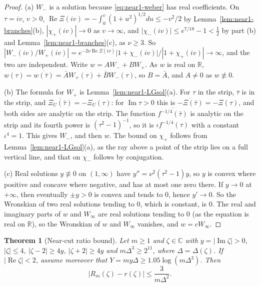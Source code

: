 \documentclass[11pt]{amsart}
\newtheorem{theorem}{Theorem}[section]
\theoremstyle{definition}
\theoremstyle{remark}
\numberwithin{equation}{section}
\newcommand{\C}{\mathbb{C}}
\newcommand{\R}{\mathbb{R}}
\DeclareMathOperator{\re}{Re}
\DeclareMathOperator{\im}{Im}
\begin{document}
\begin{proof}
(a) $W_-$ is a solution because \eqref{eq:near1-weber} has real coefficients. On $\tau=iv$, $v>0$, $\re\Xi(iv)=-\int_0^v(1+u^2)^{1/2}du\le-v^2/2$ by Lemma~\ref{lem:near1-branches}(b), $|\chi_+(iv)|\to0$ as $v\to\infty$, and $|\chi_-(iv)|\le e^{7/18}-1<\frac12$ by part (b) and Lemma~\ref{lem:near1-branches}(c), as $\nu\ge3$. So $|W_-(iv)/W_+(iv)|=e^{-2\nu\re\Xi(iv)}|1+\chi_-(iv)|/|1+\chi_+(iv)|\to\infty$, and the two are independent. Write $w=AW_-+BW_+$. As $w$ is real on $\R$, $w(\tau)=\overline{w(\bar\tau)}=\bar AW_+(\tau)+\bar BW_-(\tau)$, so $B=\bar A$, and $A\ne0$ as $w\not\equiv0$.

(b) The formula for $W_+$ is Lemma~\ref{lem:near1-LGsol}(a). For $\tau$ in the strip, $\bar\tau$ is in the strip, and $\overline{\Xi_U(\bar\tau)}=-\Xi_U(\tau)$: for $\im\tau>0$ this is $\overline{-\Xi(\bar\tau)}=-\Xi(\tau)$, and both sides are analytic on the strip. The function $\overline{f^{-1/4}(\bar\tau)}$ is analytic on the strip and its fourth power is $(\tau^2-1)^{-1}$, so it is $\iota f^{-1/4}(\tau)$ with a constant $\iota^4=1$. This gives $W_-$, and then $w$. The bound on $\chi_+$ follows from Lemma~\ref{lem:near1-LGsol}(a), as the ray above a point of the strip lies on a full vertical line, and that on $\chi_-$ follows by conjugation.

(c) Real solutions $y\not\equiv0$ on $(1,\infty)$ have $y''=\nu^2(\tau^2-1)y$, so $y$ is convex where positive and concave where negative, and has at most one zero there. If $y\to0$ at $+\infty$, then eventually $\pm y>0$ is convex and tends to $0$, hence $y'\to0$. So the Wronskian of two real solutions tending to $0$, which is constant, is $0$. The real and imaginary parts of $w$ and $W_\infty$ are real solutions tending to $0$ (as the equation is real on $\R$), so the Wronskian of $w$ and $W_\infty$ vanishes, and $w=cW_\infty$.
\end{proof}

\begin{theorem}[Near-cut ratio bound]\label{thm:near1-ratio}
Let $m\ge1$ and $\zeta\in\C$ with $y=|\im\zeta|>0$, $|\zeta|\le4$, $|\zeta-2|\ge4y$, $|\zeta+2|\ge4y$ and $m\Delta^3\ge2^{11}$, where $\Delta=\Delta(\zeta)$. If $|\re\zeta|<2$, assume moreover that $Y=my\Delta\ge1.05\log(m\Delta^3)$. Then
\[
|R_m(\zeta)-r(\zeta)|\le\frac3{m\Delta^2}.
\]
\end{theorem}
\end{document}
